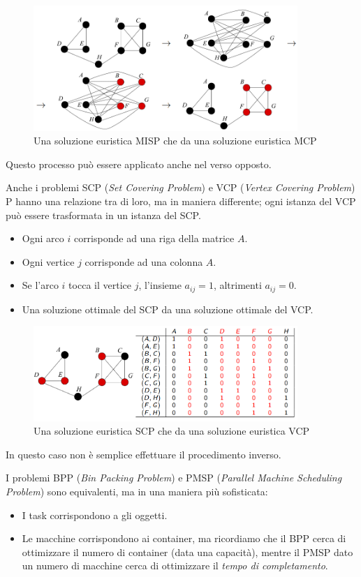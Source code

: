 \documentclass{article}
\begin{document}
\begin{figure}[H]
    \centering
    \includegraphics[width=10cm]{images/interlude5_complementary.png}
    \caption{Una soluzione euristica MISP che da una soluzione euristica MCP}
    \label{fig:interlude_5_graph}
\end{figure}

Questo processo può essere applicato anche nel verso opposto.

Anche i problemi SCP (\textit{Set Covering Problem}) e VCP (\textit{Vertex Covering Problem}) P hanno una relazione tra di loro, ma in maniera differente; ogni istanza del
VCP può essere trasformata in un istanza del SCP.
\begin{itemize}
    \item Ogni arco $i$ corrisponde ad una riga della matrice $A$.
    \item Ogni vertice $j$ corrisponde ad una colonna $A$.
    \item Se l'arco $i$ tocca il vertice $j$, l'insieme $a_{ij}=1$, altrimenti $a_{ij}=0$.
    \item Una soluzione ottimale del SCP da una soluzione ottimale del VCP.
\end{itemize}

\begin{figure}[H]
    \centering
    \includegraphics[width=10cm]{images/interlude5_vcp_scp.png}
    \caption{Una soluzione euristica SCP che da una soluzione euristica VCP}
    \label{fig:interlude5_vcp_scp}
\end{figure}
In questo caso non è semplice effettuare il procedimento inverso.

I problemi BPP (\textit{Bin Packing Problem}) e PMSP (\textit{Parallel Machine Scheduling Problem})
sono equivalenti, ma in una maniera più sofisticata:
\begin{itemize}
    \item I task corrispondono a gli oggetti.
    \item Le macchine corrispondono ai container, ma ricordiamo che il BPP cerca di ottimizzare il numero di
          container (data una capacità), mentre il PMSP dato un numero di macchine cerca di ottimizzare il \textit{tempo
              di completamento}.
\end{itemize}
\end{document}
